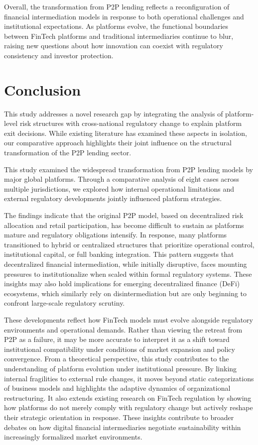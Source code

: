 \documentclass[pdflatex,sn-apa]{sn-jnl}%
\theoremstyle{thmstyleone}%
\theoremstyle{thmstyletwo}%
\theoremstyle{thmstylethree}%
\begin{document}
Overall, the transformation from P2P lending reflects a reconfiguration of financial intermediation models in response to both operational challenges and institutional expectations. As platforms evolve, the functional boundaries between FinTech platforms and traditional intermediaries continue to blur, raising new questions about how innovation can coexist with regulatory consistency and investor protection.

\section{Conclusion}\label{sec13}

This study addresses a novel research gap by integrating the analysis of platform-level risk structures with cross-national regulatory change to explain platform exit decisions. While existing literature has examined these aspects in isolation, our comparative approach highlights their joint influence on the structural transformation of the P2P lending sector.

This study examined the widespread transformation from P2P lending models by major global platforms. Through a comparative analysis of eight cases across multiple jurisdictions, we explored how internal operational limitations and external regulatory developments jointly influenced platform strategies.

The findings indicate that the original P2P model, based on decentralized risk allocation and retail participation, has become difficult to sustain as platforms mature and regulatory obligations intensify. In response, many platforms transitioned to hybrid or centralized structures that prioritize operational control, institutional capital, or full banking integration. \textcolor{NavyBlue}{This pattern suggests that decentralized financial intermediation, while initially disruptive, faces mounting pressures to institutionalize when scaled within formal regulatory systems. These insights may also hold implications for emerging decentralized finance (DeFi) ecosystems, which similarly rely on disintermediation but are only beginning to confront large-scale regulatory scrutiny.}

These developments reflect how FinTech models must evolve alongside regulatory environments and operational demands. Rather than viewing the retreat from P2P as a failure, it may be more accurate to interpret it as a shift toward institutional compatibility under conditions of market expansion and policy convergence. \textcolor{NavyBlue}{From a theoretical perspective, this study contributes to the understanding of platform evolution under institutional pressure. By linking internal fragilities to external rule changes, it moves beyond static categorizations of business models and highlights the adaptive dynamics of organizational restructuring. It also extends existing research on FinTech regulation by showing how platforms do not merely comply with regulatory change but actively reshape their strategic orientation in response. These insights contribute to broader debates on how digital financial intermediaries negotiate sustainability within increasingly formalized market environments.}
\end{document}
